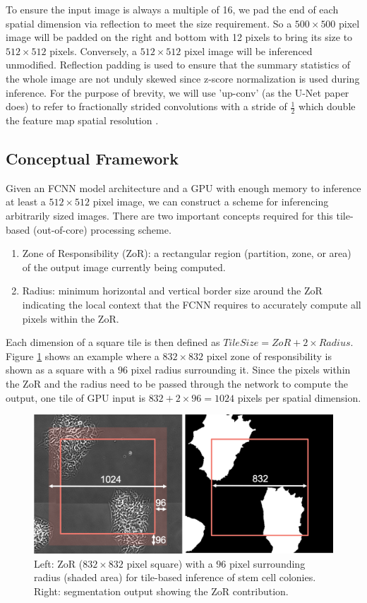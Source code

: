 \documentclass[runningheads]{llncs}
\begin{document}
To ensure the input image is always a multiple of 16, we pad the end of each spatial dimension via reflection to meet the size requirement. So a $500 \times 500$ pixel image will be padded on the right and bottom with 12 pixels to bring its size to $512 \times 512$ pixels. Conversely, a $512 \times 512$ pixel image will be inferenced unmodified. Reflection padding is used to ensure that the summary statistics of the whole image are not unduly skewed since z-score normalization is used during inference. 
For the purpose of brevity, we will use 'up-conv' (as the U-Net paper does) to refer to fractionally strided convolutions with a stride of $\frac{1}{2}$ which double the feature map spatial resolution \cite{Dumoulin2018}.

\subsection{Conceptual Framework}

Given an FCNN model architecture and a GPU with enough memory to inference at least a $512 \times 512$ pixel image, we can construct a scheme for inferencing arbitrarily sized images. There are two important concepts required for this tile-based (out-of-core) processing scheme. 
\begin{enumerate}
	\item Zone of Responsibility (ZoR): a rectangular region (partition, zone, or area) of the output image currently being computed.
	\item Radius: minimum horizontal and vertical border size around the ZoR indicating the local context that the FCNN requires to accurately compute all pixels within the ZoR.
\end{enumerate}

Each dimension of a square tile is then defined as $TileSize = ZoR + 2 \times Radius$. 
Figure \ref{fig:zor} shows an example where a $832 \times 832$ pixel zone of responsibility is shown as a square with a $96$ pixel radius surrounding it. 
Since the pixels within the ZoR and the radius need to be passed through the network to compute the output, one tile of GPU input is $832 + 2 \times 96 = 1024$ pixels per spatial dimension.

\begin{figure}[h!]
	\centering
		\includegraphics[width=\linewidth]{figs/zor.png}
	\caption{Left: ZoR ($832 \times 832$ pixel square) with a $96$ pixel surrounding radius (shaded area) for tile-based inference of stem cell colonies. Right: segmentation output showing the ZoR contribution.}
	\label{fig:zor}
\end{figure}
\end{document}
